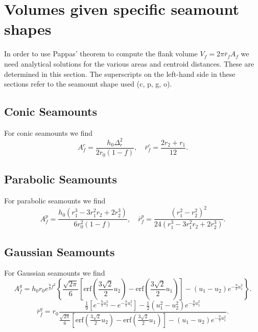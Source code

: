 \documentclass[12pt,letterpaper,margin=0.5in]{report}
\begin{document}
\section{Volumes given specific seamount shapes}

In order to use Pappas' theorem to compute the flank volume $V_f = 2 \pi \bar{r}_f A_f$ we need analytical
solutions for the various areas and centroid distances.  These are determined in this section. The superscripts
on the left-hand side in these sections refer to the seamount shape used (c, p, g, o).

\subsection{Conic Seamounts}

For conic seamounts we find
\begin{equation}
A_f^c = \frac{h_0 \Delta_r^2}{2 r_0 (1-f)}, \quad \bar{r}_f^c = \frac{2 r_2 + r_1}{12}.
\end{equation}

\subsection{Parabolic Seamounts}

For parabolic seamounts we find
\begin{equation}
A_f^p = \frac{h_0 \left ( r_1^3 - 3 r_1^2 r_2 + 2 r_2^3\right)}{6 r_0^2 (1-f)}, \quad \bar{r}_f^p = \frac{\left (r_1^2 - r_2^2 \right )^2}{24 \left ( r_1^3 - 3 r_1^2 r_2 + 2 r_2^3\right)}.
\end{equation}

\subsection{Gaussian Seamounts}

For Gaussian seamounts we find
\begin{equation}
A_f^g = h_0 r_0 e^{\frac{9}{2}f^2} \left \{ \frac{\sqrt{2\pi}}{6} \left [\mbox{erf} \left ( \frac{3\sqrt{2}}{2}u_2\right ) - \mbox{erf} \left ( \frac{3\sqrt{2}}{2}u_1 \right ) \right ] - (u_1 - u_2)e^{-\frac{9}{2} u_1^2} \right \}.
\end{equation}
\begin{equation}
\bar{r}_f^g = r_0\frac{\frac{1}{9} \left [e^{-\frac{9}{2}u_2^2} - e^{-\frac{9}{2}u_1^2} \right ] - \frac{1}{2}\left (u_1^2 - u_2^2 \right )e^{-\frac{9}{2}u_1^2}}{\frac{\sqrt{2\pi}}{6}\left [\mbox{erf} \left ( \frac{3\sqrt{2}}{2}u_2\right ) - \mbox{erf} \left ( \frac{3\sqrt{2}}{2}u_1 \right ) \right ] - (u_1 - u_2)e^{-\frac{9}{2}u_1^2}}.
\end{equation}
\end{document}
